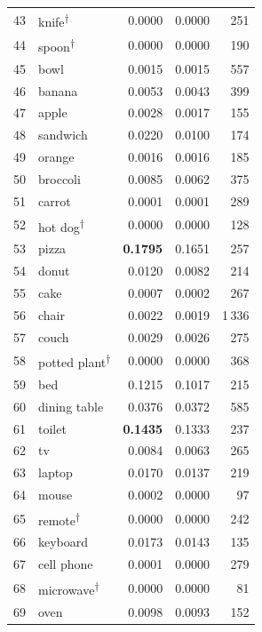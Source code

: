 \begin{longtable}{rlrrr}
43 & knife\textsuperscript{$\dagger$}           & 0.0000 & 0.0000 &    251 \\
44 & spoon\textsuperscript{$\dagger$}           & 0.0000 & 0.0000 &    190 \\
45 & bowl            & 0.0015 & 0.0015 &    557 \\
46 & banana          & 0.0053 & 0.0043 &    399 \\
47 & apple           & 0.0028 & 0.0017 &    155 \\
48 & sandwich        & 0.0220 & 0.0100 &    174 \\
49 & orange          & 0.0016 & 0.0016 &    185 \\
50 & broccoli        & 0.0085 & 0.0062 &    375 \\
51 & carrot          & 0.0001 & 0.0001 &    289 \\
52 & hot dog\textsuperscript{$\dagger$}         & 0.0000 & 0.0000 &    128 \\
53 & pizza           & \textbf{0.1795} & 0.1651 &    257 \\
54 & donut           & 0.0120 & 0.0082 &    214 \\
55 & cake            & 0.0007 & 0.0002 &    267 \\
56 & chair           & 0.0022 & 0.0019 & 1\,336 \\
57 & couch           & 0.0029 & 0.0026 &    275 \\
58 & potted plant\textsuperscript{$\dagger$}    & 0.0000 & 0.0000 &    368 \\
59 & bed             & 0.1215 & 0.1017 &    215 \\
60 & dining table    & 0.0376 & 0.0372 &    585 \\
61 & toilet          & \textbf{0.1435} & 0.1333 &    237 \\
62 & tv              & 0.0084 & 0.0063 &    265 \\
63 & laptop          & 0.0170 & 0.0137 &    219 \\
64 & mouse           & 0.0002 & 0.0000 &     97 \\
65 & remote\textsuperscript{$\dagger$}          & 0.0000 & 0.0000 &    242 \\
66 & keyboard        & 0.0173 & 0.0143 &    135 \\
67 & cell phone      & 0.0001 & 0.0000 &    279 \\
68 & microwave\textsuperscript{$\dagger$}       & 0.0000 & 0.0000 &     81 \\
69 & oven            & 0.0098 & 0.0093 &    152 \\

\end{longtable}
